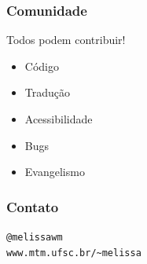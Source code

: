 \documentclass{beamer}
\begin{document}
\begin{frame}
   \frametitle{Comunidade}
   Todos podem contribuir!
   \begin{itemize}
   \item Código
   \item Tradução
   \item Acessibilidade
   \item Bugs
   \item Evangelismo
   \end{itemize}
\end{frame}

\begin{frame}[fragile]
   \frametitle{Contato}
   \begin{center}
      \begin{minipage}{0.7\textwidth}
      \begin{block}{}
         \begin{center}
            \verb+@melissawm+\\
            \verb+www.mtm.ufsc.br/~melissa+
         \end{center}
      \end{block}
   \end{minipage}
   \end{center}
\end{frame}
\end{document}
